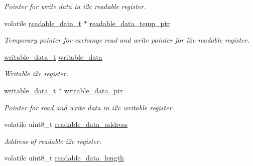 \begin{DoxyCompactItemize}
\begin{DoxyCompactList}\small\item\em Pointer for write data in i2c readable register. \end{DoxyCompactList}\item 
\mbox{\label{i2c-th_8h_ae8dc647e7272fabb6881c64f98b47a01}} 
volatile \hyperlink{structreadable__data__t}{readable\+\_\+data\+\_\+t} $\ast$ \hyperlink{i2c-th_8h_ae8dc647e7272fabb6881c64f98b47a01}{readable\+\_\+data\+\_\+temp\+\_\+ptr}
\begin{DoxyCompactList}\small\item\em Temporary pointer for exchange read and write pointer for i2c readable register. \end{DoxyCompactList}\item 
\mbox{\label{i2c-th_8h_a4ebae70bf7be3eb353c52c5b4104fca9}} 
\hyperlink{structwritable__data__t}{writable\+\_\+data\+\_\+t} \hyperlink{i2c-th_8h_a4ebae70bf7be3eb353c52c5b4104fca9}{writable\+\_\+data}
\begin{DoxyCompactList}\small\item\em Writable i2c register. \end{DoxyCompactList}\item 
\mbox{\label{i2c-th_8h_a69435b30022db229f79c9a67574008ec}} 
\hyperlink{structwritable__data__t}{writable\+\_\+data\+\_\+t} $\ast$ \hyperlink{i2c-th_8h_a69435b30022db229f79c9a67574008ec}{writable\+\_\+data\+\_\+ptr}
\begin{DoxyCompactList}\small\item\em Pointer for read and write data in i2c writable register. \end{DoxyCompactList}\item 
\mbox{\label{i2c-th_8h_ae75498e0d428e94dd8895abec0af11ca}} 
volatile uint8\+\_\+t \hyperlink{i2c-th_8h_ae75498e0d428e94dd8895abec0af11ca}{readable\+\_\+data\+\_\+address}
\begin{DoxyCompactList}\small\item\em Address of readable i2c register. \end{DoxyCompactList}\item 
\mbox{\label{i2c-th_8h_a202892f30149022049fb90b5db0ddbfa}} 
volatile uint8\+\_\+t \hyperlink{i2c-th_8h_a202892f30149022049fb90b5db0ddbfa}{readable\+\_\+data\+\_\+length}

\end{DoxyCompactItemize}
